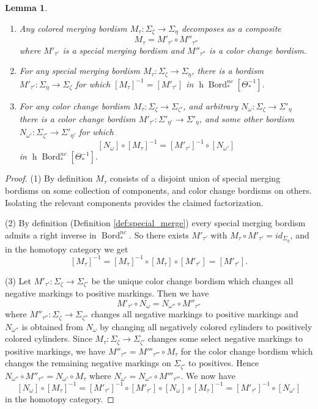 \documentclass[reqno]{amsart}
\newtheorem{lemma}{Lemma}[section]
\theoremstyle{definition}
\newcommand{\opn}[1]{\operatorname{#1}}
\DeclareMathOperator{\Bord}{Bord}
\renewcommand{\1}{\mathbf{1}}
\begin{document}
\begin{lemma}\label{lem:rel1}
\begin{enumerate}
\item Any colored merging bordism $M_{\tau}:\Sigma_{\zeta}\to \Sigma_{\eta}$ decomposes as a composite
\[
M_{\tau}=M'_{\tau'}\circ M''_{\tau''}
\]
where $M'_{\tau'}$ is a special merging bordism and $M''_{\tau''}$ is a color change bordism.\vspace{1mm}
\item For any special merging bordism $M_{\tau}:\Sigma_{\zeta}\to \Sigma_{\eta}$, there is a bordism $M'_{\tau'}:\Sigma_{\eta}\to \Sigma_{\zeta}$ for which $[M_{\tau}]^{-1}=[M'_{\tau'}]$ in $\opn{h}\Bord_{\ast}^{nc}[\Theta_{\ast}^{-1}]$.\vspace{1mm}
\item For any color change bordism $M_{\tau}:\Sigma_{\zeta}\to \Sigma_{\zeta'}$, and arbitrary $N_{\omega}:\Sigma_{\zeta}\to \Sigma'_{\eta}$ there is a color change bordism $M'_{\tau'}:\Sigma'_{\eta'}\to \Sigma'_{\eta}$, and some other bordism $N_{\omega'}:\Sigma_{\zeta'}\to \Sigma'_{\eta'}$ for which
\[
[N_{\omega}]\circ [M_{\tau}]^{-1}=[M'_{\tau'}]^{-1}\circ[N_{\omega'}]
\]
in $\opn{h}\Bord_{\ast}^{nc}[\Theta^{-1}_{\ast}]$.
\end{enumerate}
\end{lemma}

\begin{proof}
(1) By definition $M_{\tau}$ consists of a disjoint union of special merging bordisms on some collection of components, and color change bordisms on others.  Isolating the relevant components provides the claimed factorization.
\par

(2) By definition (Definition \ref{def:special_merge}) every special merging bordism admits a right inverse in $\Bord_{\ast}^{nc}$.   So there exists $M'_{\tau'}$ with $M_{\tau}\circ M'_{\tau'}=id_{\Sigma_{\eta}}$, and in the homotopy category we get
\[
[M_{\tau}]^{-1}=[M_{\tau}]^{-1}\circ[M_{\tau}]\circ[M'_{\tau'}]=[M'_{\tau'}].
\]
\par

(3) Let $M'_{\tau'}:\Sigma_{\zeta}\to \Sigma_{\zeta'}$ be the unique color change bordism which changes all negative markings to positive markings.  Then we have
\[
M'_{\tau'}\circ N_{\omega}=N_{\omega''}\circ M''_{\tau''}
\]
where $M''_{\tau''}:\Sigma_{\zeta}\to \Sigma_{\zeta''}$ changes all negative markings to positive markings and $N_{\omega''}$ is obtained from $N_{\omega}$ by changing all negatively colored cylinders to positively colored cylinders.  Since $M_{\tau}:\Sigma_{\zeta}\to \Sigma_{\zeta'}$ changes some select negative markings to positive markings, we have $M''_{\tau''}=M'''_{\tau'''}\circ M_{\tau}$ for the color change bordism which changes the remaining negative markings on $\Sigma_{\zeta'}$ to positives.  Hence $N_{\omega''}\circ M''_{\tau''}=N_{\omega'}\circ M_{\tau}$ where $N_{\omega'}=N_{\omega''}\circ M'''_{\tau'''}$.  We now have 
\[
[N_{\omega}]\circ [M_{\tau}]^{-1}=[M'_{\tau'}]^{-1}\circ[M'_{\tau'}]\circ[N_{\omega}]\circ[M_{\tau}]^{-1}=[M'_{\tau'}]^{-1}\circ[N_{\omega'}]
\]
in the homotopy category.
\end{proof}
\end{document}
